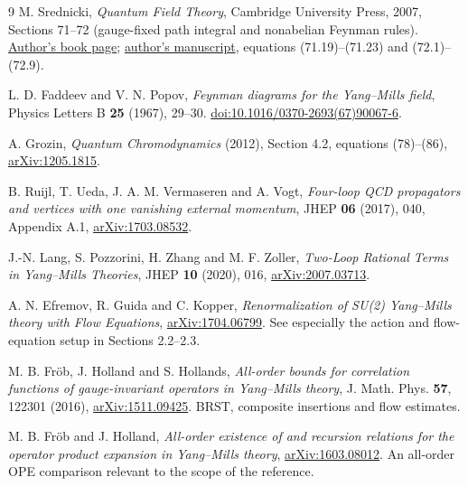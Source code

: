 \documentclass[11pt]{article}
\begin{document}
\begin{thebibliography}{9}
M. Srednicki, \emph{Quantum Field Theory}, Cambridge University Press, 2007,
Sections 71--72 (gauge-fixed path integral and nonabelian Feynman rules).
\href{https://web.physics.ucsb.edu/~mark/qft.html}{Author's book page};
\href{https://web.physics.ucsb.edu/~mark/ms-qft-DRAFT.pdf}{author's manuscript},
equations (71.19)--(71.23) and (72.1)--(72.9).

L. D. Faddeev and V. N. Popov,
\emph{Feynman diagrams for the Yang--Mills field},
Physics Letters B \textbf{25} (1967), 29--30.
\href{https://doi.org/10.1016/0370-2693(67)90067-6}{doi:10.1016/0370-2693(67)90067-6}.

A. Grozin, \emph{Quantum Chromodynamics} (2012), Section 4.2,
equations (78)--(86), \href{https://arxiv.org/abs/1205.1815}{arXiv:1205.1815}.

B. Ruijl, T. Ueda, J. A. M. Vermaseren and A. Vogt,
\emph{Four-loop QCD propagators and vertices with one vanishing external momentum},
JHEP \textbf{06} (2017), 040, Appendix A.1,
\href{https://arxiv.org/abs/1703.08532}{arXiv:1703.08532}.

J.-N. Lang, S. Pozzorini, H. Zhang and M. F. Zoller,
\emph{Two-Loop Rational Terms in Yang--Mills Theories},
JHEP \textbf{10} (2020), 016,
\href{https://arxiv.org/abs/2007.03713}{arXiv:2007.03713}.

A. N. Efremov, R. Guida and C. Kopper,
\emph{Renormalization of SU(2) Yang--Mills theory with Flow Equations},
\href{https://arxiv.org/abs/1704.06799}{arXiv:1704.06799}.
See especially the action and flow-equation setup in Sections 2.2--2.3.

M. B. Fr\"ob, J. Holland and S. Hollands,
\emph{All-order bounds for correlation functions of gauge-invariant
operators in Yang--Mills theory}, J. Math. Phys. \textbf{57}, 122301 (2016),
\href{https://arxiv.org/abs/1511.09425}{arXiv:1511.09425}.
BRST, composite insertions and flow estimates.

M. B. Fr\"ob and J. Holland,
\emph{All-order existence of and recursion relations for the operator
product expansion in Yang--Mills theory},
\href{https://arxiv.org/abs/1603.08012}{arXiv:1603.08012}.
An all-order OPE comparison relevant to the scope of the reference.
\end{thebibliography}
\endgroup
\end{document}
